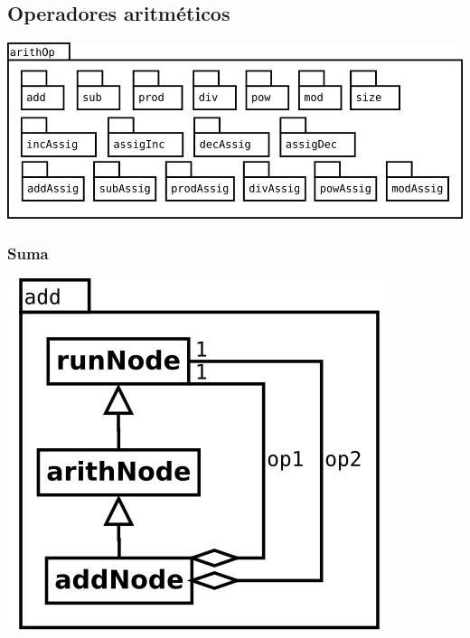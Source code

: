 \pagebreak
\subsection {Operadores aritméticos}
\begin{center}
\includegraphics[scale=0.4]{arithOp-package.png} \\
\end{center}

\subsubsection {Suma}
\begin{center}
\includegraphics[scale=0.4]{add.png} \\
\end{center}

